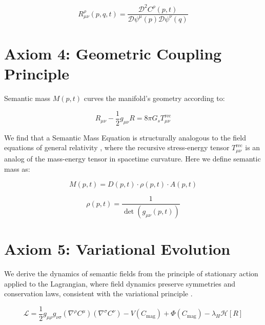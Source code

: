 \begin{equation}
R^\rho_{\mu\nu}(p,q,t) = \frac{\mathcal{D}^2 C^\rho(p,t)}{\mathcal{D} \psi^\mu(p) \mathcal{D} \psi^\nu(q)}
\end{equation}


\section{Axiom 4: Geometric Coupling Principle}
\label{1.4:axiom_4_geometric_coupling_principle}

Semantic mass \(M(p,t)\) curves the manifold's geometry according to:

\begin{equation}
R_{\mu\nu} - \frac{1}{2}g_{\mu\nu}R = 8\pi G_s T^{\text{rec}}_{\mu\nu}
\end{equation}

We find that a Semantic Mass Equation is structurally analogous to the field equations of general relativity \autocite{Einstein1915, MisnerThorneWheeler1973, Wald1984}, where the recursive stress-energy tensor \(T^{\text{rec}}_{\mu\nu}\) is an analog of the mass-energy tensor in spacetime curvature. Here we define semantic mass as:

\begin{equation}
M(p,t) = D(p,t) \cdot \rho(p,t) \cdot A(p,t)
\end{equation}

\begin{equation}
\rho(p,t) = \frac{1}{\det(g_{\mu\nu}(p,t))}
\end{equation}


\section{Axiom 5: Variational Evolution}
\label{1.5:axiom_5_variational_evolution}

We derive the dynamics of semantic fields from the principle of stationary action applied to the Lagrangian, where field dynamics preserve symmetries and conservation laws, consistent with the variational principle \autocite{GoldsteinPooleSafko2002, Arnold1989}.

\begin{equation}
\mathcal{L} = \frac{1}{2} g_{\mu\rho} g_{\nu\sigma} (\nabla^\rho C^\mu)(\nabla^\sigma C^\nu) - V(C_{\text{mag}}) + \Phi(C_{\text{mag}}) - \lambda_H \mathcal{H}[R]
\end{equation}

